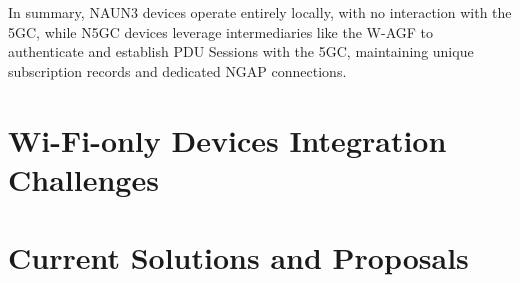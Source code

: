 In summary, \ac{NAUN3} devices operate entirely locally, with no interaction with the \ac{5GC}, while \ac{N5GC} devices leverage intermediaries like the \ac{W-AGF} to authenticate and establish \ac{PDU} Sessions with the \ac{5GC}, maintaining unique subscription records and dedicated \ac{NGAP} connections.


\section{Wi-Fi-only Devices Integration Challenges}

\section{Current Solutions and Proposals}